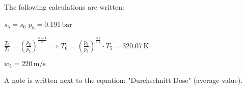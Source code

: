 The following calculations are written:  

\( s_5 = s_6 \)  
\( p_6 = 0.191 \, \text{bar} \)  

\( \frac{T_6}{T_5} = \left( \frac{p_6}{p_5} \right)^{\frac{n-1}{n}} \)  
\( \Rightarrow T_6 = \left( \frac{p_6}{p_5} \right)^{\frac{0.4}{1.4}} \cdot T_5 = 320.07 \, \text{K} \)  

\( w_5 = 220 \, \text{m/s} \)  

A note is written next to the equation: "Durchschnitt Dose" (average value).